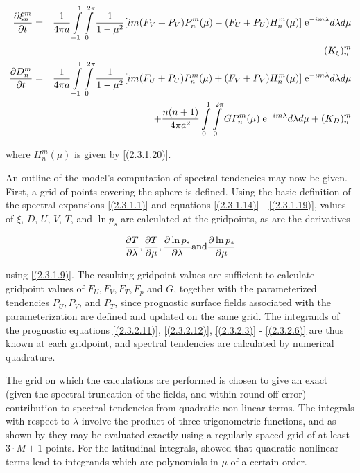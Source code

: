 \begin{eqnarray}
\frac {\partial \xi^m_n} {\partial t} & = & \frac{1}{4\pi a}\int\limits_{-1}^{1}
\int\limits_{0}^{2\pi}\frac{1}{1-\mu^2}[im(F_V+P_V)P^m_n(\mu)
-(F_U+P_U)H^m_n(\mu)]\;\mbox{e}^{-im\lambda}d\lambda d\mu\nonumber\\
&&+(K_{\xi})^m_n
\label{(2.3.2.11)}\\
\frac {\partial D^m_n} {\partial t} & = & \frac{1}{4\pi a}\int\limits_{-1}^{1}
\int\limits_{0}^{2\pi}\frac{1}{1-\mu^2}[im(F_U+P_U)P^m_n(\mu)
+(F_V+P_V)H^m_n(\mu)]\;\mbox{e}^{-im\lambda}d\lambda d\mu\nonumber\\
&&+\frac{n(n+1)}{4\pi a^2}\int\limits_{0}^{1}
\int\limits_{0}^{2\pi}GP^m_n(\mu)\;\mbox{e}^{-im\lambda}d\lambda d\mu+(K_D)^m_n
\label{(2.3.2.12)}
\end{eqnarray}

where $H^m_n(\mu)$ is given by \ref{(2.3.1.20)}. 

An outline of the model's computation of spectral tendencies may now
be given. First, a grid of points covering the sphere is
defined. Using the basic definition of the spectral expansions
\ref{(2.3.1.1)} and equations \ref{(2.3.1.14)} - \ref{(2.3.1.19)},
values of $\xi$, $D$, $U$, $V$, $T$, and $\ln{p_s}$ are calculated at the
gridpoints, as are the derivatives

\begin{equation}
\frac {\partial T} {\partial \lambda},\frac {\partial T} {\partial \mu}, \frac {\partial \ln{p_s}} {\partial \lambda} \mbox{and} \frac {\partial \ln{p_s}} {\partial \mu}\nonumber
\end{equation}

using \ref{(2.3.1.9)}. The resulting gridpoint values are sufficient
to calculate gridpoint values of $F_U, F_V, F_T, F_p$ and $G$,
together with the parameterized tendencies $P_U, P_V$, and $P_T$, since
prognostic surface fields associated with the parameterization are
defined and updated on the same grid.  The integrands of the
prognostic equations \ref{(2.3.2.11)}, \ref{(2.3.2.12)},
\ref{(2.3.2.3)} - \ref{(2.3.2.6)} are thus known at each gridpoint,
and spectral tendencies are calculated by numerical quadrature.

The grid on which the calculations are performed is chosen to give an
exact (given the spectral truncation of the fields, and within
round-off error) contribution to spectral tendencies from quadratic
non-linear terms. The integrals with respect to $\lambda$ involve the
product of three trigonometric functions, and as shown by
\cite{machenhauer72} they may be evaluated exactly using a
regularly-spaced grid of at least $3\cdot M+1$ points. For the
latitudinal integrals, \cite{eliasen70} showed that quadratic
nonlinear terms lead to integrands which are polynomials in $\mu$ of a
certain order.

